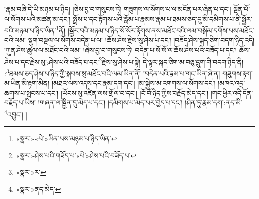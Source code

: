 །རྣམ་བཞི་དེ་ཡི་མཉམ་པ་ཉིད། །ཅེས་བྱ་བ་གསུངས་ཏེ། གཟུགས་ལ་སོགས་པ་ལ་མངོན་པར་ཞེན་པ་དང་། སྔོན་པོ་ལ་སོགས་པའི་མཚན་མ་དང་། སྤྲོས་པ་དང་རྟོགས་པའི་རློམ་པ་རྣམས་རྣམ་པ་ཐམས་ཅད་དུ་མི་དམིགས་པ་ནི་སྦྱོར་བའི་མཉམ་པ་ཉིད་ཡིན་\footnote{«སྣར་»«པེ་»ཡིན་པས་མཉམ་པ་ཉིད་ཡིན་}ནོ། །སྦྱོར་བའི་མཉམ་པ་ཉིད་སོ་སོར་རྟོགས་ནས་མཐོང་བའི་ལམ་བསྒོམ་དགོས་པས་མཐོང་བའི་ལམ། སྡུག་བསྔལ་ལ་སོགས་བདེན་པ་ལ། །ཆོས་ཤེས་རྗེས་སུ་ཤེས་པ་དང་། །བཟོད་ཤེས་སྐད་ཅིག་བདག་ཉིད་འདི། །ཀུན་ཤེས་ཚུལ་ལ་མཐོང་བའི་ལམ། །ཞེས་བྱ་བ་གསུངས་ཏེ། བདེན་པ་སོ་སོ་ལ་ཆོས་ཤེས་པའི་བཟོད་པ་དང་། ཆོས་ཤེས་པ་དང་རྗེས་སུ་:ཤེས་པའི་བཟོད་པ་དང་\footnote{«སྣར་»ཤེས་པའི་གཟོད་པ་«པེ་»ཤེས་པའི་བཟོད་པ་}རྗེས་སུ་ཤེས་པ་སྟེ། དེ་ལྟར་སྐད་ཅིག་མ་བཅུ་དྲུག་གི་བདག་ཉིད་ནི། :\footnote{«སྣར་»ར་}ཐམས་ཅད་ཤེས་པ་ཉིད་ཀྱི་སྐབས་སུ་མཐོང་བའི་ལམ་ཡིན་ནོ། །བདེན་པའི་རྣམ་པ་གང་ཡིན་ཞེ་ན། གཟུགས་རྟག་མ་ཡིན་མི་རྟག་མིན། །མཐའ་ལས་འདས་དང་རྣམ་དག་དང་། །མ་སྐྱེས་མ་འགགས་ལ་སོགས་དང་། །མཁའ་འདྲ་ཆགས་པ་སྤངས་པ་དང་། །ཡོངས་སུ་འཛིན་ལས་གྲོལ་བ་དང་། །ངོ་བོ་ཉིད་ཀྱིས་བརྗོད་མེད་དང་། །གང་ཕྱིར་འདི་དོན་བརྗོད་པ་ཡིས། །གཞན་ལ་སྦྱིན་དུ་མེད་པ་དང་། །དམིགས་པ་མེད་པར་བྱེད་པ་དང་། །ཤིན་ཏུ་རྣམ་དག་:ནད་མི་\footnote{«སྣར་»ནད་མེད་}འབྱུང་། །
